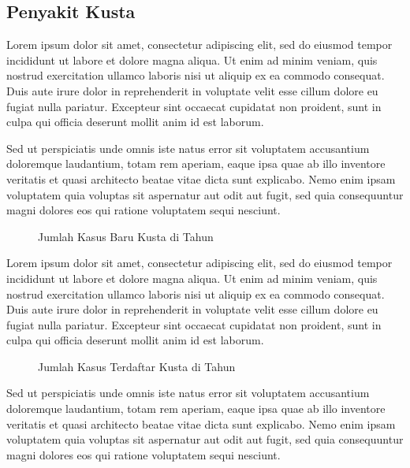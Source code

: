 \subsection{Penyakit Kusta}
Lorem ipsum dolor sit amet, consectetur adipiscing elit, sed do eiusmod tempor incididunt ut labore et dolore magna aliqua. Ut enim ad minim veniam, quis nostrud exercitation ullamco laboris nisi ut aliquip ex ea commodo consequat. Duis aute irure dolor in reprehenderit in voluptate velit esse cillum dolore eu fugiat nulla pariatur. Excepteur sint occaecat cupidatat non proident, sunt in culpa qui officia deserunt mollit anim id est laborum.

Sed ut perspiciatis unde omnis iste natus error sit voluptatem accusantium doloremque laudantium, totam rem aperiam, eaque ipsa quae ab illo inventore veritatis et quasi architecto beatae vitae dicta sunt explicabo. Nemo enim ipsam voluptatem quia voluptas sit aspernatur aut odit aut fugit, sed quia consequuntur magni dolores eos qui ratione voluptatem sequi nesciunt.

\begin{figure}[H]
	\centering
	\caption{Jumlah Kasus Baru Kusta di \namaKabupaten Tahun \tP}
	\label{fig:Jumlah-Kasus-Baru-Kusta}
\end{figure}

Lorem ipsum dolor sit amet, consectetur adipiscing elit, sed do eiusmod tempor incididunt ut labore et dolore magna aliqua. Ut enim ad minim veniam, quis nostrud exercitation ullamco laboris nisi ut aliquip ex ea commodo consequat. Duis aute irure dolor in reprehenderit in voluptate velit esse cillum dolore eu fugiat nulla pariatur. Excepteur sint occaecat cupidatat non proident, sunt in culpa qui officia deserunt mollit anim id est laborum.

\begin{figure}[H]
	\centering
	\caption{Jumlah Kasus Terdaftar Kusta di \namaKabupaten Tahun \tP}
	\label{fig:Jumlah-Kasus-Terdaftar-Kusta}
\end{figure}

Sed ut perspiciatis unde omnis iste natus error sit voluptatem accusantium doloremque laudantium, totam rem aperiam, eaque ipsa quae ab illo inventore veritatis et quasi architecto beatae vitae dicta sunt explicabo. Nemo enim ipsam voluptatem quia voluptas sit aspernatur aut odit aut fugit, sed quia consequuntur magni dolores eos qui ratione voluptatem sequi nesciunt.

